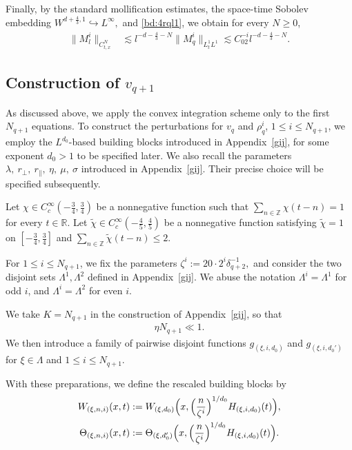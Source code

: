 \documentclass[UTF-8,reqno]{amsart}
\numberwithin{equation}{section}
\theoremstyle{definition}
\def\geq{\geqslant}
\def\leq{\leqslant}
\def\geq{\geqslant}
\def\leq{\leqslant}
\begin{document}
Finally, by the standard mollification estimates, the space-time Sobolev embedding
$
W^{d+\frac43,1}\hookrightarrow L^\infty,
$
and \eqref{bd:4rql1}, we obtain for every $N\geq0$,
\begin{align}
\|M_l^i\|_{C_{t,x}^N}
&\lesssim
l^{-d-\frac43-N}
\|M_q^i\|_{L_t^1L^1}
\lesssim
C_02^{-i}l^{-d-\frac43-N}.
\label{bd:4mlcn}
\end{align} 
 

 
   


\subsection{Construction of $v_{q+1}$}\label{sec:4defq+1}
As discussed above, we apply the convex integration scheme only to the first $N_{q+1}$ equations. 
To construct the perturbations for $v_q$ and $\rho_q^i$, $1\leq i\leq N_{q+1}$, we employ the $L^{d_0}$-based building blocks introduced in Appendix~\ref{gij}, for some exponent $d_0>1$ to be specified later. 
We also recall the parameters
$
\lambda,\ r_\perp,\ r_\parallel,\ \eta,\ \mu,\ \sigma
$
introduced in Appendix~\ref{gij}. Their precise choice will be specified subsequently.

Let
$
\chi\in C_c^\infty(-\frac34,\frac34)
$
be a nonnegative function such that
$
\sum_{n\in\mathbb{Z}}\chi(t-n)=1
$
for every $t\in\mathbb{R}$.
Let
$
\tilde{\chi}\in C_c^\infty(-\frac45,\frac45)
$
be a nonnegative function satisfying
$
\tilde{\chi}=1
$
on
$
[-\frac34,\frac34]
$
and
$
\sum_{n\in\mathbb{Z}}\tilde{\chi}(t-n)\leq2.
$

For $1\leq i\leq N_{q+1}$, we fix the parameters
$
\zeta^i:=20\cdot2^i\delta_{q+2}^{-1},
$
and consider the two disjoint sets
$
\Lambda^1,\Lambda^2
$
defined in Appendix~\ref{gij}. 
We abuse the notation
$
\Lambda^i=\Lambda^1
$
for odd $i$, and
$
\Lambda^i=\Lambda^2
$
for even $i$.

We take
$
K=N_{q+1}
$
in the construction of Appendix~\ref{gij}, so that
\begin{align}
\eta N_{q+1}\ll1.
\label{etan}
\end{align}
We then introduce a family of pairwise disjoint functions
$
g_{(\xi,i,d_0)}
$
and
$
g_{(\xi,i,d_0')}
$
for
$
\xi\in\Lambda
$
and
$
1\leq i\leq N_{q+1}.
$

With these preparations, we define the rescaled building blocks by
\begin{align*}
W_{(\xi,n,i)}(x,t)
&:=
W_{(\xi,d_0)}
\Bigl(
x,
\Bigl(\frac{n}{\zeta^i}\Bigr)^{1/d_0}
H_{(\xi,i,d_0)}(t)
\Bigr),
\\
\Theta_{(\xi,n,i)}(x,t)
&:=
\Theta_{(\xi,d_0')}
\Bigl(
x,
\Bigl(\frac{n}{\zeta^i}\Bigr)^{1/d_0}
H_{(\xi,i,d_0)}(t)
\Bigr).
\end{align*}
\end{document}
